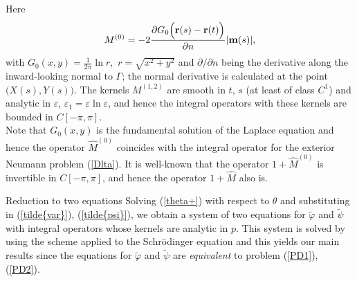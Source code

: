 \documentclass{beamer}
\newcommand{\ds}{\displaystyle}
\providecommand{\abs}[1]{\lvert#1\rvert}
\begin{document}
\begin{frame}
Here
\begin{equation}\label{M1O}
M^{(0)}=-2\ds\frac{\partial G_0\Big({\bf r}(s)-{\bf r}(t)\Big)}{\partial n} \abs{{\bf m}(s)},
\end{equation}
with $G_0(x,y)=\ds\frac{1}{2\pi} \ln r$,~$r=\sqrt{x^2+y^2}$ and $\partial/\partial n$ being the derivative along the inward-looking normal to $\Gamma$; the normal derivative is calculated at the point $\Big(X(s), Y(s)\Big)$. The kernels $M^{(1,2)}$ are smooth in $t$, $s$ (at least of class $C^1$) and analytic in $\varepsilon$, $\varepsilon_1=\varepsilon\ln\varepsilon$, and hence the integral operators with these kernels are bounded in $C[-\pi,\pi]$.\\
Note that $G_0(x,y)$ is the fundamental solution of the Laplace equation and hence the operator $\hat M^{(0)}$ coincides with the integral operator for the exterior Neumann problem (\ref{Dlta}).
It is well-known  that the operator $1+\hat{M}^{(0)}$ is invertible in $C[-\pi,\pi]$, and hence the operator $1+\hat{M}$ also is. 
\end{frame}

\begin{frame}{Reduction to two equations}
Solving (\ref{theta+}) with respect to $\theta$ and substituting in (\ref{tilde{var}}), (\ref{tilde{psi}}), we obtain a system of two equations for $\tilde\varphi$ and $\tilde\psi$ with integral operators whose kernels are analytic in $p$. This system is solved by using the  scheme applied   to the Schr\"odinger equation and this yields our main  results since the equations for $\tilde\varphi$ and $\tilde\psi$ are {\it equivalent} to problem  (\ref{PD1}), (\ref{PD2}).
\end{frame}
\end{document}
